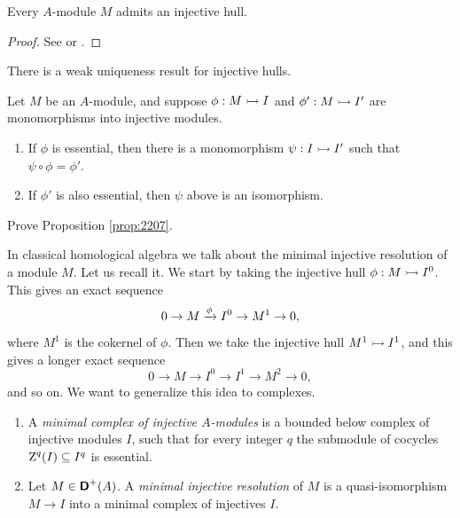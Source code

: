 \begin{prop} \label{prop:2225}
Every $A$-module $M$ admits an injective hull. 
\end{prop}

\begin{proof}
See \cite[Theorem 3.30]{Rot} or \cite[Section 3.D]{Lam}. 
\end{proof}

There is a weak uniqueness result for injective hulls.

\begin{prop} \label{prop:2207}
Let $M$ be an $A$-module, and suppose $\phi : M \rightarrowtail I$ and 
$\phi' : M \rightarrowtail I'$ are monomorphisms into injective modules. 
\begin{enumerate}
\item If $\phi$ is essential, then there is a monomorphism 
$\psi : I \rightarrowtail I'$ such that $\psi \circ \phi = \phi'$.

\item If $\phi'$ is also essential, then $\psi$ above is an isomorphism.
\end{enumerate}
\end{prop}

\begin{exer} \label{exer:2207}
Prove Proposition \ref{prop:2207}.
\end{exer}

In classical homological algebra we talk about the minimal injective resolution 
of a module $M$. Let us recall it. We start by taking the injective hull
$\phi : M \rightarrowtail I^0$. This gives an exact sequence 
\[ 0 \to M \xrightarrow{\phi} I^0 \to M^1 \to 0 , \]
where $M^1$ is the cokernel of $\phi$. Then we take the injective hull
$M^1 \rightarrowtail I^1$, and this gives a longer exact sequence 
\[ 0 \to M \to I^0 \to I^1 \to M^2 \to 0 , \]
and so on. We want to generalize this idea to complexes. 

\begin{dfn} \label{dfn:2210}
\mbox{}
\begin{enumerate}
\item A {\em minimal complex of injective $A$-modules}%
is a bounded below complex of injective modules $I$, such that for every integer 
$q$ the submodule of cocycles $\operatorname{Z}^q(I) \subseteq I^q$ is essential. 

\item Let $M \in \boldsymbol{\mathsf{D}}^+(A)$. A 
{\em minimal injective resolution}%
of $M$ is a quasi-iso\-morphism $M \to I$ into a minimal complex of injectives 
$I$.
\end{enumerate}
\end{dfn}

